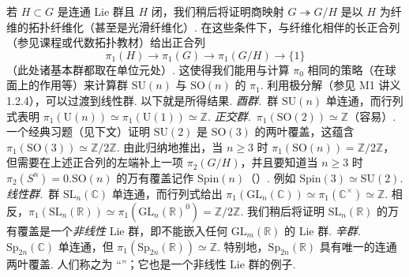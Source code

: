 \begin{numpara}[经典群的基本群]\label{np:lie-1-3-5}
若 $H\subset G$ 是连通 Lie 群且 $H$ 闭，我们稍后将证明商映射 $G\twoheadrightarrow G/H$ 是以 $H$ 为纤维的拓扑纤维化（甚至是光滑纤维化）. 在这些条件下，与纤维化相伴的长正合列（参见课程或代数拓扑教材）给出正合列
\[
\pi_1(H)\longrightarrow\pi_1(G)\longrightarrow\pi_1(G/H)\longrightarrow\{1\}
\]
（此处诸基本群都取在单位元处）. 这使得我们能用与计算 $\pi_0$ 相同的策略（在球面上的作用等）来计算群 $\mathrm{SU}(n)$ 与 $\mathrm{SO}(n)$ 的 $\pi_1$. 利用极分解（参见 M1 讲义 1.2.4），可以过渡到线性群. 以下就是所得结果.
\textit{酉群.}\ 群 $\mathrm{SU}(n)$ 单连通，而行列式表明 $\pi_1(\mathrm{U}(n))\simeq\pi_1(\mathrm{U}(1))\simeq\mathbb Z$.
\textit{正交群.}\ $\pi_1(\mathrm{SO}(2))\simeq\mathbb Z$（容易）. 一个经典习题（见下文）证明 $\mathrm{SU}(2)$ 是 $\mathrm{SO}(3)$ 的两叶覆盖，这蕴含 $\pi_1(\mathrm{SO}(3))\simeq\mathbb Z/2\mathbb Z$. 由此归纳地推出，当 $n\geqslant3$ 时 $\pi_1(\mathrm{SO}(n))=\mathbb Z/2\mathbb Z$，但需要在上述正合列的左端补上一项 $\pi_2(G/H)$，并且要知道当 $n\geqslant3$ 时 $\pi_2(S^n)=0$.$\mathrm{SO}(n)$ 的万有覆盖记作 $\mathrm{Spin}(n)$（）. 例如 $\mathrm{Spin}(3)\simeq\mathrm{SU}(2)$.
\textit{线性群.}\ 群 $\mathrm{SL}_n(\mathbb C)$ 单连通，而行列式给出 $\pi_1(\mathrm{GL}_n(\mathbb C))\simeq\pi_1(\mathbb C^{\times})\simeq\mathbb Z$. 相反，$\pi_1(\mathrm{SL}_n(\mathbb R))\simeq\pi_1(\mathrm{GL}_n(\mathbb R)^0)=\mathbb Z/2\mathbb Z$. 我们稍后将证明 $\mathrm{SL}_n(\mathbb R)$ 的万有覆盖是一个\emph{非线性} Lie 群，即不能嵌入任何 $\mathrm{GL}_m(\mathbb R)$ 的 Lie 群.
\textit{辛群.}\ $\mathrm{Sp}_{2n}(\mathbb C)$ 单连通，但 $\pi_1(\mathrm{Sp}_{2n}(\mathbb R))\simeq\mathbb Z$. 特别地，$\mathrm{Sp}_{2n}(\mathbb R)$ 具有唯一的连通两叶覆盖. 人们称之为 ``''；它也是一个非线性 Lie 群的例子.
\end{numpara}
